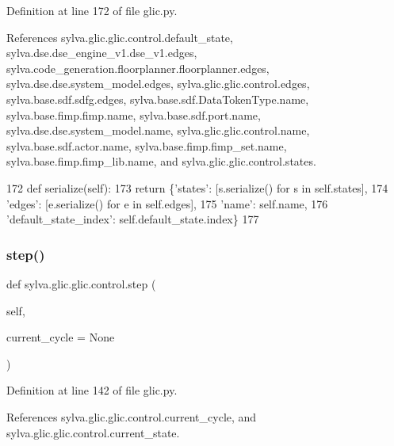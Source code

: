 Definition at line 172 of file glic.\+py.



References sylva.\+glic.\+glic.\+control.\+default\+\_\+state, sylva.\+dse.\+dse\+\_\+engine\+\_\+v1.\+dse\+\_\+v1.\+edges, sylva.\+code\+\_\+generation.\+floorplanner.\+floorplanner.\+edges, sylva.\+dse.\+dse.\+system\+\_\+model.\+edges, sylva.\+glic.\+glic.\+control.\+edges, sylva.\+base.\+sdf.\+sdfg.\+edges, sylva.\+base.\+sdf.\+Data\+Token\+Type.\+name, sylva.\+base.\+fimp.\+fimp.\+name, sylva.\+base.\+sdf.\+port.\+name, sylva.\+dse.\+dse.\+system\+\_\+model.\+name, sylva.\+glic.\+glic.\+control.\+name, sylva.\+base.\+sdf.\+actor.\+name, sylva.\+base.\+fimp.\+fimp\+\_\+set.\+name, sylva.\+base.\+fimp.\+fimp\+\_\+lib.\+name, and sylva.\+glic.\+glic.\+control.\+states.


\begin{DoxyCode}
172     \textcolor{keyword}{def }serialize(self):
173       \textcolor{keywordflow}{return} \{\textcolor{stringliteral}{'states'}: [s.serialize() \textcolor{keywordflow}{for} s \textcolor{keywordflow}{in} self.states],
174               \textcolor{stringliteral}{'edges'}: [e.serialize() \textcolor{keywordflow}{for} e \textcolor{keywordflow}{in} self.edges],
175               \textcolor{stringliteral}{'name'}: self.name,
176               \textcolor{stringliteral}{'default\_state\_index'}: self.default\_state.index\}
177 
\end{DoxyCode}
\mbox{\label{classsylva_1_1glic_1_1glic_1_1control_aea52fc110901323d58833de74918965e}} 
\subsubsection{\texorpdfstring{step()}{step()}}
{\footnotesize\ttfamily def sylva.\+glic.\+glic.\+control.\+step (\begin{DoxyParamCaption}\item[{}]{self,  }\item[{}]{current\+\_\+cycle = {\ttfamily None} }\end{DoxyParamCaption})}



Definition at line 142 of file glic.\+py.



References sylva.\+glic.\+glic.\+control.\+current\+\_\+cycle, and sylva.\+glic.\+glic.\+control.\+current\+\_\+state.


